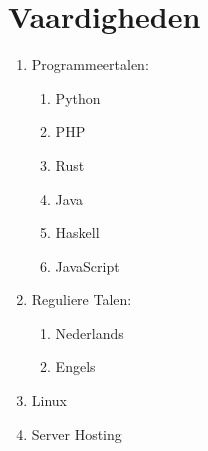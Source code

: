 \documentclass[a4paper,12pt]{article}
\begin{document}
\section{Vaardigheden}
\begin{enumerate}
    \item Programmeertalen:
        \begin{enumerate}
            \item Python
            \item PHP
            \item Rust
            \item Java
            \item Haskell
            \item JavaScript
        \end{enumerate}
    \item Reguliere Talen:
        \begin{enumerate}
            \item Nederlands
            \item Engels
        \end{enumerate}
    \item Linux
    \item Server Hosting
\end{enumerate}

\vfill
{}
\end{document}
